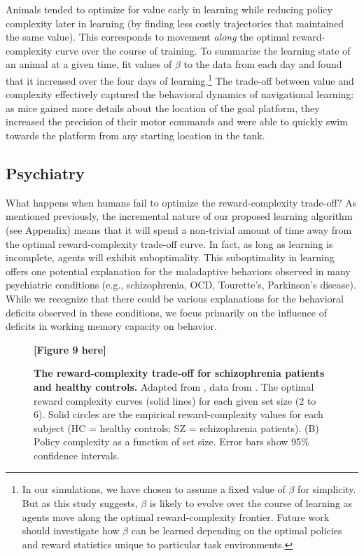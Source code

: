 \documentclass[11pt]{article}
\begin{document}
Animals tended to optimize for value early in learning while reducing policy complexity later in learning (by finding less costly trajectories that maintained the same value). This corresponds to movement \textit{along} the optimal reward-complexity curve over the course of training. To summarize the learning state of an animal at a given time, \cite{Amir2020-lm} fit values of $\beta$ to the data from each day and found that it increased over the four days of learning.\footnote{In our simulations, we have chosen to assume a fixed value of $\beta$ for simplicity. But as this study suggests, $\beta$ is likely to evolve over the course of learning as agents move along the optimal reward-complexity frontier. Future work should investigate how $\beta$ can be learned depending on the optimal policies and reward statistics unique to particular task environments.} The trade-off between value and complexity effectively captured the behavioral dynamics of navigational learning: as mice gained more details about the location of the goal platform, they increased the precision of their motor commands and were able to quickly swim towards the platform from any starting location in the tank. 

\subsection{Psychiatry}

What happens when humans fail to optimize the reward-complexity trade-off? As mentioned previously, the incremental nature of our proposed learning algorithm (see Appendix) means that it will spend a non-trivial amount of time away from the optimal reward-complexity trade-off curve. In fact, as long as learning is incomplete, agents will exhibit suboptimality. This suboptimality in learning offers one potential explanation for the maladaptive behaviors observed in many psychiatric conditions (e.g., schizophrenia, OCD, Tourette's, Parkinson's disease). While we recognize that there could be various explanations for the behavioral deficits observed in these conditions, we focus primarily on the influence of deficits in working memory capacity on behavior. 

\begin{figure}
    \centering
    \textbf{[Figure 9 here]}
            \caption{\textbf{The reward-complexity trade-off for schizophrenia patients and healthy controls.} Adapted from \cite{gershmanlai20}, data from \cite{collins14}. The optimal reward complexity curves (solid lines) for each given set size (2 to 6). Solid circles are the empirical reward-complexity values for each subject (HC = healthy controls; SZ = schizophrenia patients). (B) Policy complexity as a function of set size. Error bars show 95\% confidence intervals.}
    \label{fig:collins14main}
\end{figure}
\end{document}
